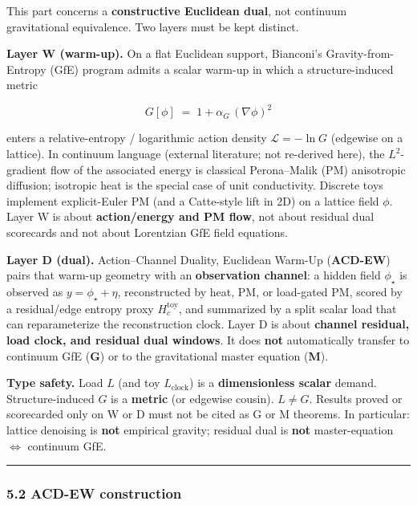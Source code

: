 \documentclass[
  11pt,
]{article}
\begin{document}
This part concerns a \textbf{constructive Euclidean dual}, not continuum
gravitational equivalence. Two layers must be kept distinct.

\textbf{Layer W (warm-up).} On a flat Euclidean support, Bianconi's
Gravity-from-Entropy (GfE) program admits a scalar warm-up in which a
structure-induced metric

\[
G[\phi] \;=\; 1 + \alpha_G\,(\nabla\phi)^2
\]

enters a relative-entropy / logarithmic action density
\(\mathcal{L}=-\ln G\) (edgewise on a lattice). In continuum language
(external literature; not re-derived here), the \(L^2\)-gradient flow of
the associated energy is classical Perona--Malik (PM) anisotropic
diffusion; isotropic heat is the special case of unit conductivity.
Discrete toys implement explicit-Euler PM (and a Catte-style lift in 2D)
on a lattice field \(\phi\). Layer W is about \textbf{action/energy and
PM flow}, not about residual dual scorecards and not about Lorentzian
GfE field equations.

\textbf{Layer D (dual).} Action--Channel Duality, Euclidean Warm-Up
(\textbf{ACD-EW}) pairs that warm-up geometry with an
\textbf{observation channel}: a hidden field \(\phi_\star\) is observed
as \(y=\phi_\star+\eta\), reconstructed by heat, PM, or load-gated PM,
scored by a residual/edge entropy proxy \(H_c^{\mathrm{toy}}\), and
summarized by a split scalar load that can reparameterize the
reconstruction clock. Layer D is about \textbf{channel residual, load
clock, and residual dual windows}. It does \textbf{not} automatically
transfer to continuum GfE (\textbf{G}) or to the gravitational master
equation (\textbf{M}).

\textbf{Type safety.} Load \(L\) (and toy \(L_{\mathrm{clock}}\)) is a
\textbf{dimensionless scalar} demand. Structure-induced \(G\) is a
\textbf{metric} (or edgewise cousin). \textbf{\(L\neq G\)}. Results
proved or scorecarded only on W or D must not be cited as G or M
theorems. In particular: lattice denoising is \textbf{not} empirical
gravity; residual dual is \textbf{not} master-equation
\(\Leftrightarrow\) continuum GfE.

\begin{center}\rule{0.5\linewidth}{0.5pt}\end{center}

\subsubsection{5.2 ACD-EW construction}\label{acd-ew-construction}
\end{document}
